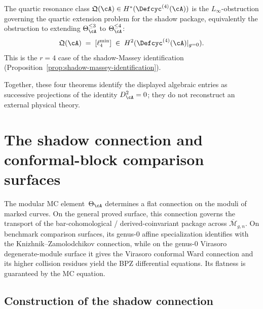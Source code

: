 \begin{theorem}[Quartic obstruction $=$ $L_\infty$ bracket;
\ClaimStatusProvedElsewhere]
\label{thm:thqg-intro-quartic-linfty}
The quartic resonance class
$\mathfrak{Q}(\cA) \in H^*(\Defcyc^{(4)}(\cA))$ is the
$L_\infty$-obstruction governing the quartic extension problem for the
shadow package, equivalently the obstruction to extending
$\Theta_\cA^{\le 3}$ to $\Theta_\cA^{\le 4}$:
\[
\mathfrak{Q}(\cA)
\;=\;
[\ell_4^{\mathrm{min}}]
\;\in\;
H^2(\Defcyc^{(4)}(\cA)|_{g=0}).
\]
This is the $r = 4$ case of the shadow-Massey identification
\textup{(}Proposition~\textup{\ref{prop:shadow-massey-identification}}\textup{)}.
\end{theorem}

Together, these four theorems identify the displayed algebraic entries
as successive projections of the identity $D_\cA^2 = 0$; they do not
reconstruct an external physical theory.



\section{The shadow connection and conformal-block comparison surfaces}
\label{sec:thqg-intro-shadow-connection}

The modular MC element~$\Theta_\cA$ determines a flat connection on
the moduli of marked curves. On the general proved surface,
this connection governs the transport of the bar-cohomological /
derived-coinvariant package across
$\overline{\mathcal{M}}_{g,n}$. On benchmark comparison
surfaces, its genus-$0$ affine specialization identifies with the
Knizhnik--Zamolodchikov connection, while on the genus-$0$ Virasoro
degenerate-module surface it gives the Virasoro conformal Ward
connection and its higher collision residues yield the BPZ differential
equations. Its flatness is guaranteed by the MC equation.

\subsection{Construction of the shadow connection}
\label{subsec:thqg-intro-shadow-connection-construction}


